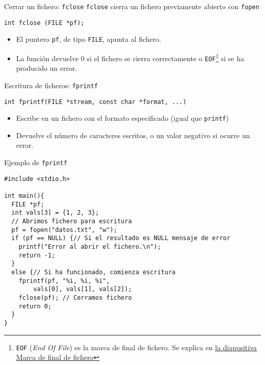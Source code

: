 \documentclass[usenames,svgnames,dvipsnames, aspectratio=169]{beamer}
\begin{document}
\begin{frame}[label={sec:orgeec8079},fragile]{Cerrar un fichero: \texttt{fclose}}
 \texttt{fclose} cierra un fichero previamente abierto con \texttt{fopen}

\lstset{language=C,label= ,caption= ,captionpos=b,numbers=none}
\begin{lstlisting}
int fclose (FILE *pf);
\end{lstlisting}

\begin{itemize}
\item El puntero \texttt{pf}, de tipo \texttt{FILE}, apunta al fichero.
\item La función devuelve 0 si el fichero se cierra correctamente o \texttt{EOF}\footnote{\texttt{EOF} (\emph{End Of File}) es la marca de final de fichero. Se explica en \hyperlink{sec:org48a6f15}{la diapositiva \guillemotleft{}Marca de final de fichero\guillemotright{}}} si se ha producido un error.
\end{itemize}
\end{frame}

\begin{frame}[label={sec:orgb710bc8},fragile]{Escritura de ficheros: \texttt{fprintf}}
 \lstset{language=C,label= ,caption= ,captionpos=b,numbers=none}
\begin{lstlisting}
int fprintf(FILE *stream, const char *format, ...)
\end{lstlisting}

\begin{itemize}
\item Escribe en un fichero con el formato especificado (\alert{igual que \texttt{printf}})

\item Devuelve el número de caracteres escritos, o un valor negativo si ocurre un error.
\end{itemize}
\end{frame}


\begin{frame}[label={sec:org01437fa},fragile,plain]{Ejemplo de \texttt{fprintf}}
 \lstset{language=C,label= ,caption= ,captionpos=b,numbers=none}
\begin{lstlisting}
#include <stdio.h>

int main(){
  FILE *pf;
  int vals[3] = {1, 2, 3};
  // Abrimos fichero para escritura
  pf = fopen("datos.txt", "w");
  if (pf == NULL) {// Si el resultado es NULL mensaje de error 
    printf("Error al abrir el fichero.\n");
    return -1;
  }
  else {// Si ha funcionado, comienza escritura
    fprintf(pf, "%i, %i, %i",
	    vals[0], vals[1], vals[2]);
    fclose(pf); // Cerramos fichero
    return 0;
  }
}
\end{lstlisting}
\end{frame}
\end{document}
